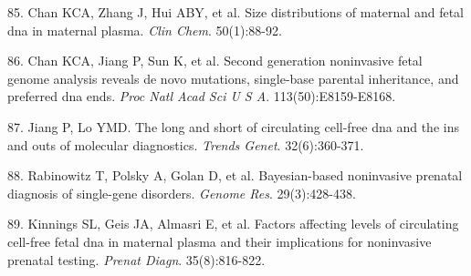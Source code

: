 \documentclass[11pt,letterpaper]{book}
\begin{document}
\leavevmode\hypertarget{ref-chan:2004aa}{}%
85. Chan KCA, Zhang J, Hui ABY, et al. Size distributions of maternal and fetal dna in maternal plasma. \emph{Clin Chem}. 50(1):88-92.

\leavevmode\hypertarget{ref-chan:2016aa}{}%
86. Chan KCA, Jiang P, Sun K, et al. Second generation noninvasive fetal genome analysis reveals de novo mutations, single-base parental inheritance, and preferred dna ends. \emph{Proc Natl Acad Sci U S A}. 113(50):E8159-E8168.

\leavevmode\hypertarget{ref-jiang:2016ab}{}%
87. Jiang P, Lo YMD. The long and short of circulating cell-free dna and the ins and outs of molecular diagnostics. \emph{Trends Genet}. 32(6):360-371.

\leavevmode\hypertarget{ref-rabinowitz:2019aa}{}%
88. Rabinowitz T, Polsky A, Golan D, et al. Bayesian-based noninvasive prenatal diagnosis of single-gene disorders. \emph{Genome Res}. 29(3):428-438.

\leavevmode\hypertarget{ref-kinnings:2015aa}{}%
89. Kinnings SL, Geis JA, Almasri E, et al. Factors affecting levels of circulating cell-free fetal dna in maternal plasma and their implications for noninvasive prenatal testing. \emph{Prenat Diagn}. 35(8):816-822.

\backmatter
\end{document}
